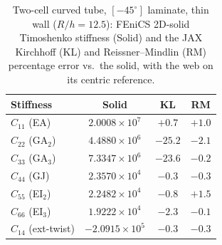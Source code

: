 \begin{table}[htpb]
\centering
\caption{Two-cell curved tube, $[-45^\circ]$ laminate, thin wall ($R/h = 12.5$): FEniCS 2D-solid Timoshenko stiffness (Solid) and the JAX Kirchhoff (KL) and Reissner--Mindlin (RM) percentage error vs.\ the solid, with the web on its centric reference.}
\label{tab:mc2_aniso_thin}
\begin{tabular}{lccc}
\hline
Stiffness & Solid & KL & RM \\
\hline
$C_{11}$ (EA) & $2.0008{\times}10^{7}$ & $+0.7$ & $+1.0$ \\
$C_{22}$ (GA$_2$) & $4.4880{\times}10^{6}$ & $-25.2$ & $-2.1$ \\
$C_{33}$ (GA$_3$) & $7.3347{\times}10^{6}$ & $-23.6$ & $-0.2$ \\
$C_{44}$ (GJ) & $2.3570{\times}10^{4}$ & $-0.3$ & $-0.3$ \\
$C_{55}$ (EI$_2$) & $2.2482{\times}10^{4}$ & $-0.8$ & $+1.5$ \\
$C_{66}$ (EI$_3$) & $1.9222{\times}10^{4}$ & $-2.3$ & $-0.1$ \\
$C_{14}$ (ext-twist) & $-2.0915{\times}10^{5}$ & $-0.3$ & $-0.3$ \\
\hline
\end{tabular}
\end{table}
